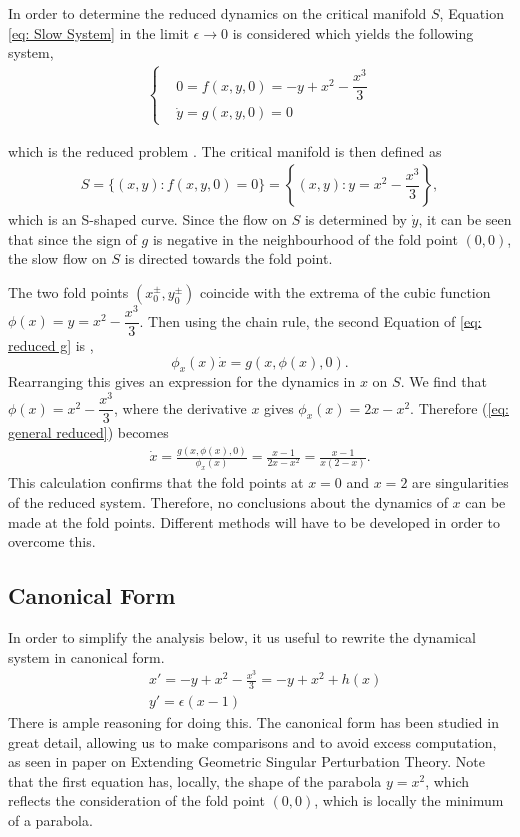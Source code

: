 In order to determine the reduced dynamics on the critical manifold $S$, Equation \ref{eq: Slow System} in the limit $\epsilon\to 0$ is considered which yields the following system,
\begin{align}
\begin{cases}
    &0=f(x,y,0)=-y+x^2-\dfrac{x^3}{3}\\
        &\dot{y}=g(x,y,0)=0 \label{eq: reduced g}
\end{cases}
\end{align}

which is the reduced problem \citep{Kuehn}. 
The critical manifold is then defined as 
\begin{align}
S= \{ (x,y) : f(x,y,0)=0 \} = \left\{ (x,y) : y = x^2-\dfrac{x^3}{3}\right \},
\end{align}
which is an S-shaped curve. 
Since the flow on $S$ is determined by $\dot{y}$, it can be seen that since the sign of $g$ is negative in the neighbourhood of the fold point $(0,0)$, the slow flow on $S$ is directed towards the fold point.

The two  fold points $(x_0^\pm,y_0^\pm)$ coincide with the extrema of the cubic function  $ \phi(x) = y = x^2-\dfrac{x^3}{3}$.
Then using the chain rule, the second Equation of \ref{eq: reduced g} is  \citep{krupa2001},
\begin{equation}
    \phi_x(x)\dot{x}=g(x,\phi(x),0).
    \label{eq: general reduced}
\end{equation}
Rearranging this gives an expression for the dynamics in $x$ on $S$.
We find that $\phi(x)=x^2-\dfrac{x^3}{3}$, where the derivative \wrt $x$ gives $\phi_x(x)=2x-x^2$.
Therefore (\ref{eq: general reduced}) becomes 
\begin{align*}
	\dot{x} = \frac{g(x,\phi(x),0)}{ \phi_x(x)} = \frac{ x-1}{2x-x^2} =\frac{ x-1}{x(2-x)}.
\end{align*}
This calculation confirms that the fold points at $x=0$ and $x=2$ are singularities of the reduced system. Therefore, no conclusions about the dynamics of $x$ can be made at the fold points. Different methods will have to be developed in order to overcome this.

\subsection{Canonical Form}
In order to simplify the analysis below, it us useful to rewrite the dynamical system in canonical form.
\begin{equation}
    \begin{aligned}
        &x'=-y+x^2-\frac{x^3}{3}=-y+x^2+h(x) \\
        &y'=\epsilon(x-1)
    \end{aligned}
    \label{eq: canonical}
\end{equation}
There is ample reasoning for doing this. The canonical form has been studied in great detail, allowing us to make comparisons and to avoid excess computation, as seen in \citet{krupa2001} paper on Extending Geometric Singular Perturbation Theory.  Note that the first equation has, locally, the shape of the parabola $y= x^2$, which reflects the consideration of the fold point $(0,0)$, which is locally the minimum of a parabola.


